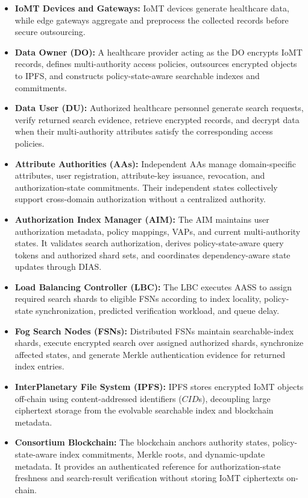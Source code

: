 \documentclass{ieeetj}
\theoremstyle{ieee-style}
\begin{document}
\begin{itemize}

\item \textbf{IoMT Devices and Gateways:}
IoMT devices generate healthcare data, while edge gateways aggregate and
preprocess the collected records before secure outsourcing.

\item \textbf{Data Owner (DO):}
A healthcare provider acting as the DO encrypts IoMT records, defines
multi-authority access policies, outsources encrypted objects to IPFS,
and constructs policy-state-aware searchable indexes and commitments.

\item \textbf{Data User (DU):}
Authorized healthcare personnel generate search requests, verify returned
search evidence, retrieve encrypted records, and decrypt data when their
multi-authority attributes satisfy the corresponding access policies.

\item \textbf{Attribute Authorities (AAs):}
Independent AAs manage domain-specific attributes, user registration,
attribute-key issuance, revocation, and authorization-state commitments.
Their independent states collectively support cross-domain authorization
without a centralized authority.

\item \textbf{Authorization Index Manager (AIM):}
The AIM maintains user authorization metadata, policy mappings, VAPs, and
current multi-authority states. It validates search authorization, derives
policy-state-aware query tokens and authorized shard sets, and coordinates
dependency-aware state updates through DIAS.

\item \textbf{Load Balancing Controller (LBC):}
The LBC executes AASS to assign required search shards to eligible FSNs
according to index locality, policy-state synchronization, predicted
verification workload, and queue delay.

\item \textbf{Fog Search Nodes (FSNs):}
Distributed FSNs maintain searchable-index shards, execute encrypted
search over assigned authorized shards, synchronize affected states, and
generate Merkle authentication evidence for returned index entries.

\item \textbf{InterPlanetary File System (IPFS):}
IPFS stores encrypted IoMT objects off-chain using content-addressed
identifiers ($CID$s), decoupling large ciphertext storage from the
evolvable searchable index and blockchain metadata.

\item \textbf{Consortium Blockchain:}
The blockchain anchors authority states, policy-state-aware index
commitments, Merkle roots, and dynamic-update metadata. It provides an
authenticated reference for authorization-state freshness and
search-result verification without storing IoMT ciphertexts on-chain.

\end{itemize}
\end{document}
